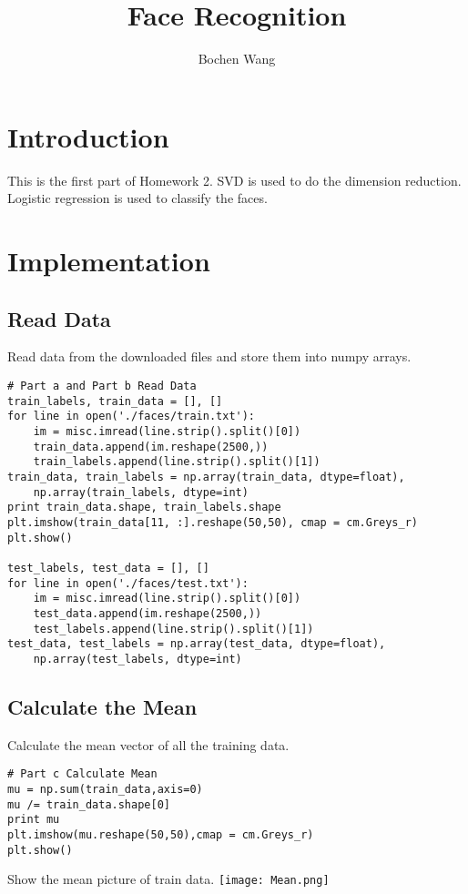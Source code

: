 \documentclass[a4paper]{article}
\begin{document}

\title{Face Recognition}
\author{Bochen Wang}
\maketitle
\section*{Introduction}
This is the first part of Homework 2. SVD is used to do the dimension reduction. Logistic regression is used to classify the faces.
\section*{Implementation}
\subsection*{Read Data}
Read data from the downloaded files and store them into numpy arrays.
\begin{lstlisting}
# Part a and Part b Read Data
train_labels, train_data = [], []
for line in open('./faces/train.txt'):
    im = misc.imread(line.strip().split()[0])
    train_data.append(im.reshape(2500,))
    train_labels.append(line.strip().split()[1])
train_data, train_labels = np.array(train_data, dtype=float), 
	np.array(train_labels, dtype=int)
print train_data.shape, train_labels.shape
plt.imshow(train_data[11, :].reshape(50,50), cmap = cm.Greys_r)
plt.show()

test_labels, test_data = [], []
for line in open('./faces/test.txt'):
    im = misc.imread(line.strip().split()[0])
    test_data.append(im.reshape(2500,))
    test_labels.append(line.strip().split()[1])
test_data, test_labels = np.array(test_data, dtype=float), 
	np.array(test_labels, dtype=int)
\end{lstlisting}

\subsection*{Calculate the Mean}
Calculate the mean vector of all the training data.
\begin{lstlisting}
# Part c Calculate Mean
mu = np.sum(train_data,axis=0)
mu /= train_data.shape[0]
print mu
plt.imshow(mu.reshape(50,50),cmap = cm.Greys_r)
plt.show()
\end{lstlisting}
Show the mean picture of train data.
\texttt{[image: Mean.png]}
\end{document}
